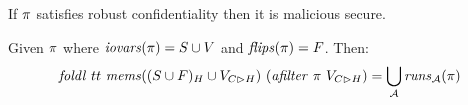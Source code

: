 \begin{theorem}
  If $\pi$ satisfies robust confidentiality then it is malicious secure.
\end{theorem}

\begin{lemma}
  \label{lemma-aruns}
  Given $\pi$ where $\mathit{iovars}(\pi) = S \cup V$ and $\mathit{flips}(\pi) = F$. Then:
  $$
  \mathit{foldl}\ {tt}\ \mathit{mems}((S \cup F)_H \cup V_{C \rhd H})\ (\mathit{afilter}\ \pi\ V_{C \rhd H}) = \bigcup_{\mathcal{A}}  \mathit{runs}_{\mathcal{A}}(\pi)
  $$
\end{lemma}


\begin{comment}
\section{Robust Declassification}

\begin{definition}[Confidentiality Modulo Output]
  \label{definition-CMO}
  We say that a program  $\prog$ satisfies \emph{confidentiality modulo output}
  iff for all $H$ and $C$ with $|C|\le|H|$ and 
  $\store_1,\store_2 \in \mems(S)$ we have:
  $$
  (\store_1 =_C \store_2 \ \wedge \ 
  (\condd{\progtt(\prog)}{\{ \outv \}}{\store_1} = \condd{\progtt(\prog)}{\{ \outv \}}{\store_2}))
  \implies 
  (\condd{\progtt(\prog)}{V_C}{\store_1} = \condd{\progtt(\prog)}{V_C}{\store_2})
  $$
  where $\iov(\prog) = (S,V)$.%
\end{definition}

\begin{definition}[Robust Declassification]
  \label{definition-RD}
  We say that a program  $\prog$ satisfies \emph{robust declassification}
  iff for all $H$ and $C$ with $|C|\le|H|$ and 
  $\store_1,\store_2 \in \mems(S)$ we have:
  $$
  (\store_1 =_H \store_2 \ \wedge \ 
  (\condd{\progtt(\prog)}{\{ \outv \}}{\store_1} = \condd{\progtt(\prog)}{\{ \outv \}}{\store_2}))
  \implies 
  (\condd{\progtt(\prog)}{V_C}{\store_1} = \condd{\progtt(\prog)}{V_C}{\store_2})
  $$
  where $\iov(\prog) = (S,V)$.%
\end{definition}


\begin{theorem}
  If $\prog$ satisfies robust declassification, then
  $\prog_{\adversary}$ satisfies confidentiality
  modulo output for all $\adversary$. 
\end{theorem}

\begin{theorem}
  If $\prog$ satisfies robust declassification then it is malicious secure.
\end{theorem}
\end{comment}

